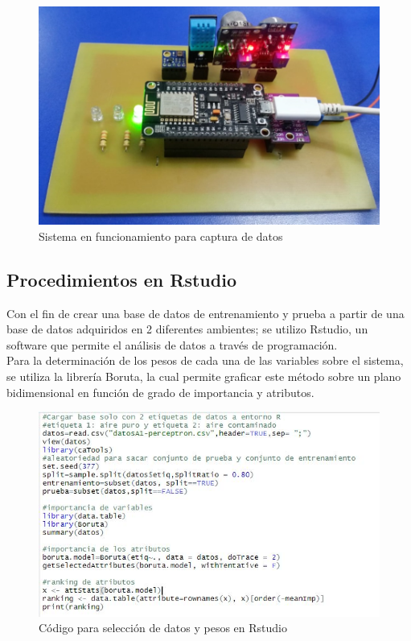 \documentclass[10pt,a4paper]{article}
\begin{document}
\begin{figure}[H]
\centering
 \includegraphics[scale=0.38]{placanueva1.JPG} 
\caption{Sistema en funcionamiento para captura de datos} 
\end{figure}

\subsection{Procedimientos en Rstudio}
Con el fin de crear una base de datos de entrenamiento y prueba a partir de una base de datos adquiridos en 2 diferentes ambientes; se utilizo Rstudio, un software que permite el análisis de datos a través de programación.\\

Para la determinación de los pesos de cada una de las variables sobre el sistema, se utiliza la librería Boruta, la cual permite graficar este método sobre un plano bidimensional en función de grado de importancia y atributos.\\

\begin{figure}[H]
\centering
 \includegraphics[scale=0.7]{codigoR.JPG} 
\caption{Código para selección de datos y pesos en Rstudio} 
\end{figure}
\end{document}
